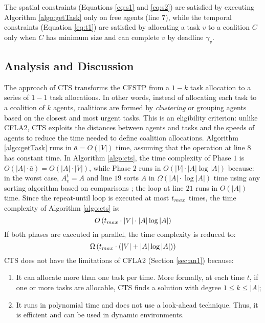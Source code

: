 The spatial constraints (Equations \ref{eq:s1} and \ref{eq:s2}) are satisfied by executing
Algorithm \ref{algo:getTask} only on free agents (line $7$), while the temporal
constraints (Equation \ref{eq:t1}) are satisfied by allocating a task $v$ to a coalition
$C$ only when $C$ has minimum size and can complete $v$ by deadline $\gamma_v$.

\subsection{Analysis and Discussion}\label{sec:nova}

The approach of CTS transforms the CFSTP from a $1 - k$ task allocation to a series of $1
- 1$ task allocations. In other words, instead of allocating each task to a coalition of
$k$ agents, coalitions are formed by \emph{clustering} or grouping agents based on the
closest and most urgent tasks. This is an eligibility criterion: unlike CFLA2, CTS
exploits the distances between agents and tasks and the speeds of agents to reduce the
time needed to define coalition allocations.
Algorithm \ref{algo:getTask} runs in $\bar{a} = O(|V|)$ time, assuming that the
operation at line $8$ has constant time. In Algorithm \ref{algo:cts}, the time
complexity of Phase $1$ is $O(|A| \cdot \bar{a}) = O(|A| \cdot |V|)$, while Phase $2$
runs in $O(|V| \cdot |A| \log |A|)$ because: in the worst case, $A^t_v = A$ and
line $19$ sorts $A$ in $\Omega(|A|\cdot\log|A|)$ time using any sorting algorithm based on
comparisons \cite{cormen2009}; the loop at line $21$ runs in $O({|A|})$ time.  Since the
\textsf{repeat-until} loop is executed at most $t_{max}$ times, the time complexity of
Algorithm \ref{algo:cts} is:
\begin{equation}\label{eq:comp1}
    O \left( t_{max} \cdot |V| \cdot |A| \log |A| \right)
\end{equation}
If both phases are executed in parallel, the time complexity is reduced to:
\begin{equation}\label{eq:comp2}
    \Omega \left( t_{max} \cdot \left( |V| + |A| \log |A| \right) \right)
\end{equation}
CTS does not have the limitations of CFLA2 (Section \ref{sec:an1}) because:
\begin{enumerate}
    \item It can allocate more than one task per time. More formally, at each time $t$, if
        one or more tasks are allocable, CTS finds a solution with degree $1 \leq k \leq
        |A|$;
    \item It runs in polynomial time and does not use a look-ahead technique. Thus, it is
        efficient and can be used in dynamic environments.
\end{enumerate}

